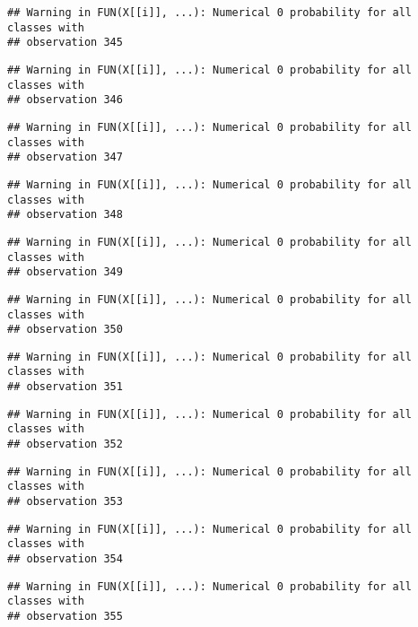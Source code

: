 \documentclass[
]{article}
\begin{document}
\begin{verbatim}
## Warning in FUN(X[[i]], ...): Numerical 0 probability for all classes with
## observation 345
\end{verbatim}

\begin{verbatim}
## Warning in FUN(X[[i]], ...): Numerical 0 probability for all classes with
## observation 346
\end{verbatim}

\begin{verbatim}
## Warning in FUN(X[[i]], ...): Numerical 0 probability for all classes with
## observation 347
\end{verbatim}

\begin{verbatim}
## Warning in FUN(X[[i]], ...): Numerical 0 probability for all classes with
## observation 348
\end{verbatim}

\begin{verbatim}
## Warning in FUN(X[[i]], ...): Numerical 0 probability for all classes with
## observation 349
\end{verbatim}

\begin{verbatim}
## Warning in FUN(X[[i]], ...): Numerical 0 probability for all classes with
## observation 350
\end{verbatim}

\begin{verbatim}
## Warning in FUN(X[[i]], ...): Numerical 0 probability for all classes with
## observation 351
\end{verbatim}

\begin{verbatim}
## Warning in FUN(X[[i]], ...): Numerical 0 probability for all classes with
## observation 352
\end{verbatim}

\begin{verbatim}
## Warning in FUN(X[[i]], ...): Numerical 0 probability for all classes with
## observation 353
\end{verbatim}

\begin{verbatim}
## Warning in FUN(X[[i]], ...): Numerical 0 probability for all classes with
## observation 354
\end{verbatim}

\begin{verbatim}
## Warning in FUN(X[[i]], ...): Numerical 0 probability for all classes with
## observation 355
\end{verbatim}
\end{document}
